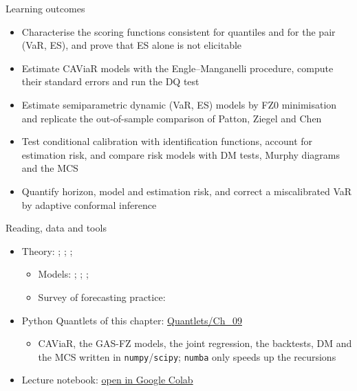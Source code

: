 \begin{frame}{Learning outcomes}
\itemsize{\small}
\begin{itemize}
    \item Characterise the scoring functions consistent for quantiles and for the pair (VaR, ES), and prove that ES alone is not elicitable
    \item Estimate CAViaR models with the Engle--Manganelli procedure, compute their standard errors and run the DQ test
    \item Estimate semiparametric dynamic (VaR, ES) models by FZ0 minimisation and replicate the out-of-sample comparison of Patton, Ziegel and Chen
    \item Test conditional calibration with identification functions, account for estimation risk, and compare risk models with DM tests, Murphy diagrams and the MCS
    \item Quantify horizon, model and estimation risk, and correct a miscalibrated VaR by adaptive conformal inference
\end{itemize}
\end{frame}

\begin{frame}{Reading, data and tools}
\itemsize{\small}
\begin{itemize}
    \item Theory: ; ; ; 
    \begin{itemize}
        \item Models: ; ; ; 
        \item Survey of forecasting practice: 
    \end{itemize}
    \item Python Quantlets of this chapter: \href{https://github.com/danpele/Advanced-Time-Series/tree/main/Quantlets/Ch_09}{Quantlets/Ch\_09}
    \begin{itemize}
        \item CAViaR, the GAS-FZ models, the joint regression, the backtests, DM and the MCS written in \texttt{numpy}/\texttt{scipy}; \texttt{numba} only speeds up the recursions
    \end{itemize}
    \item Lecture notebook: \href{\colaburl{notebooks/EN/chapter9_lecture_notebook.ipynb}}{open in Google Colab}
\end{itemize}
\end{frame}

